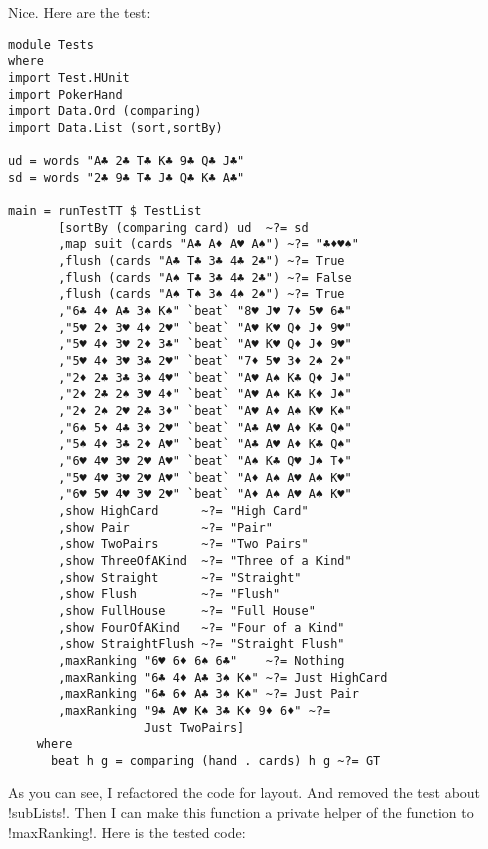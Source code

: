 \lhN Nice. Here are the test:
\begin{lstlisting}[frame=single]
module Tests
where 
import Test.HUnit
import PokerHand
import Data.Ord (comparing)
import Data.List (sort,sortBy)

ud = words "A♣ 2♣ T♣ K♣ 9♣ Q♣ J♣"
sd = words "2♣ 9♣ T♣ J♣ Q♣ K♣ A♣"

main = runTestTT $ TestList 
       [sortBy (comparing card) ud  ~?= sd
       ,map suit (cards "A♣ A♦ A♥ A♠") ~?= "♣♦♥♠"
       ,flush (cards "A♣ T♣ 3♣ 4♣ 2♣") ~?= True
       ,flush (cards "A♠ T♣ 3♣ 4♣ 2♣") ~?= False
       ,flush (cards "A♠ T♠ 3♠ 4♠ 2♠") ~?= True
       ,"6♣ 4♦ A♣ 3♠ K♠" `beat` "8♥ J♥ 7♦ 5♥ 6♣"
       ,"5♥ 2♦ 3♥ 4♦ 2♥" `beat` "A♥ K♥ Q♦ J♦ 9♥"
       ,"5♥ 4♦ 3♥ 2♦ 3♣" `beat` "A♥ K♥ Q♦ J♦ 9♥"
       ,"5♥ 4♦ 3♥ 3♣ 2♥" `beat` "7♦ 5♥ 3♦ 2♠ 2♦"
       ,"2♦ 2♣ 3♣ 3♠ 4♥" `beat` "A♥ A♠ K♣ Q♦ J♠"  
       ,"2♦ 2♣ 2♠ 3♥ 4♦" `beat` "A♥ A♠ K♣ K♦ J♠"
       ,"2♦ 2♠ 2♥ 2♣ 3♦" `beat` "A♥ A♦ A♠ K♥ K♠"
       ,"6♠ 5♦ 4♣ 3♦ 2♥" `beat` "A♣ A♥ A♦ K♣ Q♠"
       ,"5♠ 4♦ 3♣ 2♦ A♥" `beat` "A♣ A♥ A♦ K♣ Q♠"
       ,"6♥ 4♥ 3♥ 2♥ A♥" `beat` "A♠ K♣ Q♥ J♠ T♦"
       ,"5♥ 4♥ 3♥ 2♥ A♥" `beat` "A♦ A♠ A♥ A♠ K♥"
       ,"6♥ 5♥ 4♥ 3♥ 2♥" `beat` "A♦ A♠ A♥ A♠ K♥"
       ,show HighCard      ~?= "High Card"
       ,show Pair          ~?= "Pair"
       ,show TwoPairs      ~?= "Two Pairs"
       ,show ThreeOfAKind  ~?= "Three of a Kind"
       ,show Straight      ~?= "Straight"
       ,show Flush         ~?= "Flush"
       ,show FullHouse     ~?= "Full House"
       ,show FourOfAKind   ~?= "Four of a Kind"
       ,show StraightFlush ~?= "Straight Flush"
       ,maxRanking "6♥ 6♦ 6♠ 6♣"    ~?= Nothing
       ,maxRanking "6♣ 4♦ A♣ 3♠ K♠" ~?= Just HighCard
       ,maxRanking "6♣ 6♦ A♣ 3♠ K♠" ~?= Just Pair
       ,maxRanking "9♣ A♥ K♠ 3♣ K♦ 9♦ 6♦" ~?= 
                   Just TwoPairs]
    where
      beat h g = comparing (hand . cards) h g ~?= GT
\end{lstlisting} %
As you can see, I refactored the code for layout. And removed the test about \il!subLists!.
\lhA Then I can make this function a private helper of the function to \il!maxRanking!.
Here is the tested code:
